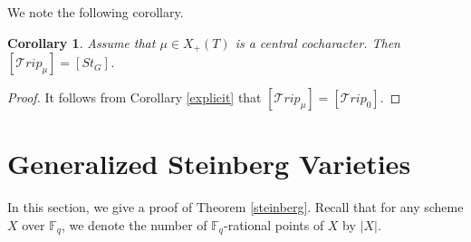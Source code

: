 \documentclass{amsart}
\theoremstyle{plain}
\newtheorem{corollary}{Corollary}[theorem]
\theoremstyle{definition}
\theoremstyle{remark}
\begin{document}
We note the following corollary.
\begin{corollary}\label{contribution trivial bundle}
Assume that $\mu\in X_{+}(T)$ is a central cocharacter. Then $[\mathcal{T}rip_{\mu}]=[St_{G}]$.
\end{corollary}
\begin{proof}
It follows from Corollary \ref{explicit} that $[\mathcal{T}rip_{\mu}]=[\mathcal{T}rip_{0}]$.
\end{proof}
\section{Generalized Steinberg Varieties}\label{Steinberg Varieties}
In this section, we give a proof of Theorem \ref{steinberg}. Recall that for any scheme $X$ over $\mathbb{F}_{q}$, we denote the number of $\mathbb{F}_{q}$-rational points of $X$ by $|X|$. 
\end{document}
